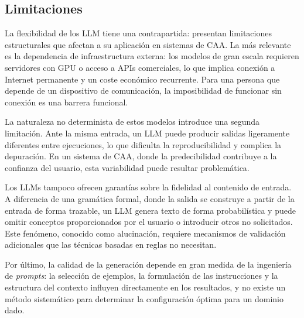 \subsection{Limitaciones}
\label{sec:f3-limitaciones}

La flexibilidad de los LLM tiene una contrapartida: presentan limitaciones estructurales que afectan a su aplicación en sistemas de CAA. La más relevante es la dependencia de infraestructura externa: los modelos de gran escala requieren servidores con GPU o acceso a APIs comerciales, lo que implica conexión a Internet permanente y un coste económico recurrente. Para una persona que depende de un dispositivo de comunicación, la imposibilidad de funcionar sin conexión es una barrera funcional.

La naturaleza no determinista de estos modelos introduce una segunda limitación. Ante la misma entrada, un LLM puede producir salidas ligeramente diferentes entre ejecuciones, lo que dificulta la reproducibilidad y complica la depuración. En un sistema de CAA, donde la predecibilidad contribuye a la confianza del usuario, esta variabilidad puede resultar problemática.

Los LLMs tampoco ofrecen garantías sobre la fidelidad al contenido de entrada. A diferencia de una gramática formal, donde la salida se construye a partir de la entrada de forma trazable, un LLM genera texto de forma probabilística y puede omitir conceptos proporcionados por el usuario o introducir otros no solicitados. Este fenómeno, conocido como alucinación, requiere mecanismos de validación adicionales que las técnicas basadas en reglas no necesitan.

Por último, la calidad de la generación depende en gran medida de la ingeniería de \textit{prompts}: la selección de ejemplos, la formulación de las instrucciones y la estructura del contexto influyen directamente en los resultados, y no existe un método sistemático para determinar la configuración óptima para un dominio dado.

